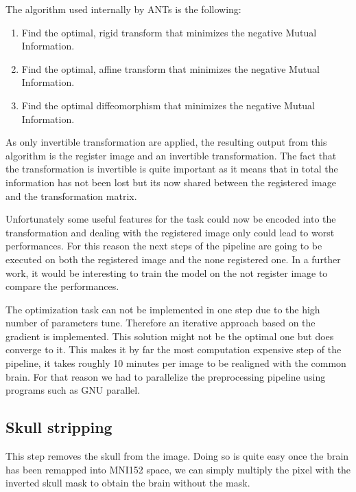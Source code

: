 The algorithm used internally by ANTs\footnotemark{} is the following:
\begin{enumerate}
\item Find the optimal, rigid transform that minimizes the negative Mutual Information.
\item Find the optimal, affine transform that minimizes the negative Mutual Information.
\item Find the optimal diffeomorphism that minimizes the negative Mutual Information.
\end{enumerate}
As only invertible transformation are applied, the resulting output from this algorithm is the register image and an invertible transformation. The fact that the transformation is invertible is quite important as it means that in total the information has not been lost but its now shared between the registered image and the transformation matrix.

Unfortunately some useful features for the task could now be encoded into the transformation and dealing with the registered image only could lead to worst performances. For this reason the next steps of the pipeline are going to be executed on both the registered image and the none registered one. In a further work, it would be interesting to train the model on the not register image to compare the performances.
 
The optimization task can not be implemented in one step due to the high number of parameters tune. Therefore an iterative approach based on the gradient is implemented. This solution might not be the optimal one but does converge to it. This makes it by far the most computation expensive step of the pipeline, it takes roughly 10 minutes per image to be realigned with the common brain. For that reason we had to parallelize the preprocessing pipeline using programs such as GNU parallel\footnotemark{}.

\subsection{Skull stripping}
This step removes the skull from the image. Doing so is quite easy once the brain has been remapped into MNI152 space, we can simply multiply the pixel with the inverted skull mask to obtain the brain without the mask. 

